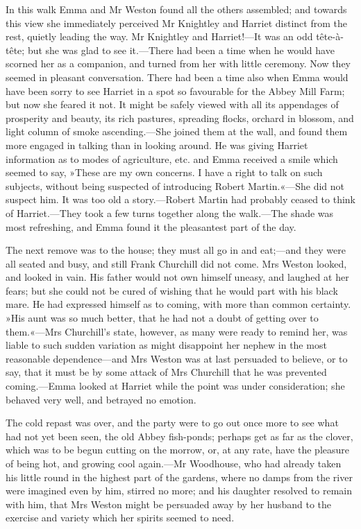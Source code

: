 In this walk Emma and Mr Weston found all the others assembled; and towards this view she immediately perceived Mr Knightley and Harriet distinct from the rest, quietly leading the way. Mr Knightley and Harriet!—It was an odd tête-à-tête; but she was glad to see it.—There had been a time when he would have scorned her as a companion, and turned from her with little ceremony. Now they seemed in pleasant conversation. There had been a time also when Emma would have been sorry to see Harriet in a spot so favourable for the Abbey Mill Farm; but now she feared it not. It might be safely viewed with all its appendages of prosperity and beauty, its rich pastures, spreading flocks, orchard in blossom, and light column of smoke ascending.—She joined them at the wall, and found them more engaged in talking than in looking around. He was giving Harriet information as to modes of agriculture, etc. and Emma received a smile which seemed to say, »These are my own concerns. I have a right to talk on such subjects, without being suspected of introducing Robert Martin.«—She did not suspect him. It was too old a story.—Robert Martin had probably ceased to think of Harriet.—They took a few turns together along the walk.—The shade was most refreshing, and Emma found it the pleasantest part of the day.

The next remove was to the house; they must all go in and eat;—and they were all seated and busy, and still Frank Churchill did not come. Mrs Weston looked, and looked in vain. His father would not own himself uneasy, and laughed at her fears; but she could not be cured of wishing that he would part with his black mare. He had expressed himself as to coming, with more than common certainty. »His aunt was so much better, that he had not a doubt of getting over to them.«—Mrs Churchill's state, however, as many were ready to remind her, was liable to such sudden variation as might disappoint her nephew in the most reasonable dependence—and Mrs Weston was at last persuaded to believe, or to say, that it must be by some attack of Mrs Churchill that he was prevented coming.—Emma looked at Harriet while the point was under consideration; she behaved very well, and betrayed no emotion.

The cold repast was over, and the party were to go out once more to see what had not yet been seen, the old Abbey fish-ponds; perhaps get as far as the clover, which was to be begun cutting on the morrow, or, at any rate, have the pleasure of being hot, and growing cool again.—Mr Woodhouse, who had already taken his little round in the highest part of the gardens, where no damps from the river were imagined even by him, stirred no more; and his daughter resolved to remain with him, that Mrs Weston might be persuaded away by her husband to the exercise and variety which her spirits seemed to need.

